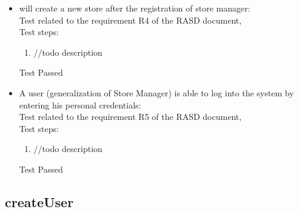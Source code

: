 \begin{itemize}
    \item will create a new store after the registration of store manager: \\
    Test related to the requirement R4 of the RASD document, \\
    Test steps:
    \begin{enumerate}
        \item //todo description
    \end{enumerate}
    Test Passed \\

    \item A user (generalization of Store Manager) is able to log into the system by entering his personal credentials: \\
    Test related to the requirement R5 of the RASD document, \\
    Test steps:
    \begin{enumerate}
        \item //todo description
    \end{enumerate}
    Test Passed \\

\end{itemize}
\subsection{createUser}

